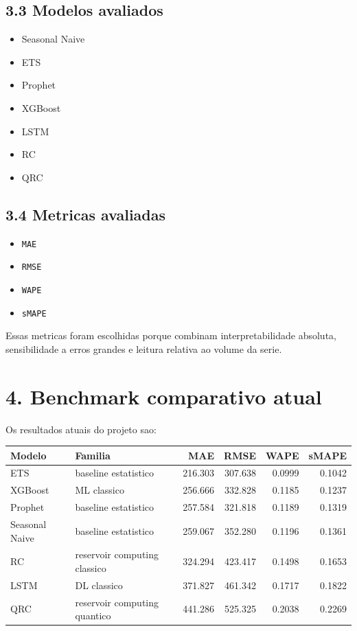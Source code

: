 \documentclass[12pt]{article}
\providecommand{\tightlist}{%
  \setlength{\itemsep}{0pt}\setlength{\parskip}{0pt}}
\begin{document}
\subsection{3.3 Modelos avaliados}\label{33-modelos-avaliados}

\begin{itemize}
\tightlist
\item
  Seasonal Naive
\item
  ETS
\item
  Prophet
\item
  XGBoost
\item
  LSTM
\item
  RC
\item
  QRC
\end{itemize}

\subsection{3.4 Metricas avaliadas}\label{34-metricas-avaliadas}

\begin{itemize}
\tightlist
\item
  \texttt{MAE}
\item
  \texttt{RMSE}
\item
  \texttt{WAPE}
\item
  \texttt{sMAPE}
\end{itemize}

Essas metricas foram escolhidas porque combinam interpretabilidade absoluta, sensibilidade a erros grandes e leitura relativa ao volume da serie.

\section{4. Benchmark comparativo atual}\label{4-benchmark-comparativo-atual}

Os resultados atuais do projeto sao:

\begin{longtable}[]{@{}llrrrr@{}}
\toprule\noalign{}
Modelo & Familia & MAE & RMSE & WAPE & sMAPE \\
\midrule\noalign{}
\endhead
\bottomrule\noalign{}
\endlastfoot
ETS & baseline estatistico & 216.303 & 307.638 & 0.0999 & 0.1042 \\
XGBoost & ML classico & 256.666 & 332.828 & 0.1185 & 0.1237 \\
Prophet & baseline estatistico & 257.584 & 321.818 & 0.1189 & 0.1319 \\
Seasonal Naive & baseline estatistico & 259.067 & 352.280 & 0.1196 & 0.1361 \\
RC & reservoir computing classico & 324.294 & 423.417 & 0.1498 & 0.1653 \\
LSTM & DL classico & 371.827 & 461.342 & 0.1717 & 0.1822 \\
QRC & reservoir computing quantico & 441.286 & 525.325 & 0.2038 & 0.2269 \\
\end{longtable}
\end{document}
